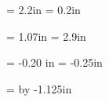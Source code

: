 

%
%
%
%
%
%




\pagestyle{empty}

\newcount\nrows\newcount\ncols
{}		%

\newdimen\vcorner \newdimen\hcorner 
\newdimen\vlabel \newdimen\hlabel

\vcorner = 2.2in	%
\hcorner = 0.2in	%

\vlabel  = 1.07in	%
\hlabel  = 2.9in	%

\newdimen \vfudge \newdimen \hfudge
\vfudge = -0.20 in 	%
\hfudge = -0.25in


\newdimen \tempp
\tempp = \hcorner 
\advance\tempp by -1.125in
\setlength{\oddsidemargin}{\tempp} %
\setlength{\evensidemargin}{\oddsidemargin}

